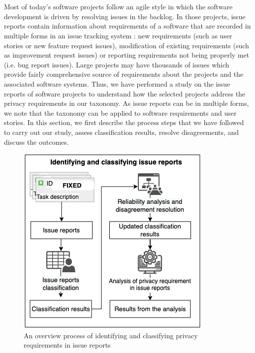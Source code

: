 \section{} \label{sec:mining}

Most of today's software projects follow an agile style in which the software development is driven by resolving issues in the backlog. In those projects, issue reports contain information about requirements of a software that are recorded in multiple forms in an issue tracking system \cite{Choetkiertikul}: new requirements (such as user stories or new feature request issues), modification of existing requirements (such as improvement request issues) or reporting requirements not being properly met (i.e. bug report issues). Large projects may have thousands of issues which provide fairly comprehensive source of requirements about the projects and the associated software systems. Thus, we have performed a study on the issue reports of software projects to understand how the selected projects address the privacy requirements in our taxonomy. As issue reports can be in multiple forms, we note that the taxonomy can be applied to software requirements and user stories. In this section, we first describe the process steps that we have followed to carry out our study, assess classification results, resolve disagreements, and discuss the outcomes.

\begin{figure}[ht]
	\centering
	\includegraphics[width=.9\linewidth]{"Figures/Mining-issue-reports"}
	\caption{An overview process of identifying and classifying privacy requirements in issue reports}
	\label{fig:Mining issue reports}
\end{figure}

